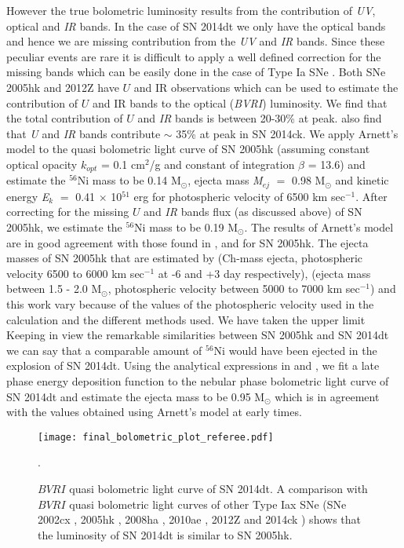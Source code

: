 \documentclass[fleqn,usenatbib]{mnras}
\begin{document}
However the true bolometric luminosity results from the contribution of {\it UV}, optical and {\it IR} bands. In the case of SN 2014dt we only have the optical bands and hence we are missing contribution from the {\it UV} and {\it IR} bands. Since these peculiar events are rare it is difficult to apply a well defined correction for the missing bands which can be easily done in the case of Type Ia SNe  \citep{sent:1996,2000A&A...359..876C}. Both SNe 2005hk and 2012Z have $U$ and IR observations which can be used to estimate the contribution of $U$ and IR bands to the optical ({\it BVRI}) luminosity. We find that the total contribution of $U$ and {\it IR} bands is between 20-30\% at peak. \cite{2016MNRAS.459.1018T} also find that {\it U} and {\it IR} bands contribute  $\sim$ 35\% at peak in SN 2014ck. We apply Arnett's model to the quasi bolometric light curve of SN 2005hk (assuming constant optical opacity $k$$_{opt}$ = 0.1 cm$^2$/g and constant of integration $\beta$ = 13.6) and estimate the $^{56}$Ni mass to be 0.14 M$_{\odot}$, ejecta mass {\it M$_{ej}$} $=$ 0.98 M$_{\odot}$ and kinetic energy {\it E$_{k}$} $=$ 0.41 $\times$ 10$^{51}$ erg for photospheric velocity of 6500 km sec$^{-1}$. After correcting for the missing $U$ and {\it IR} bands flux (as discussed above) of SN 2005hk, we estimate the $^{56}$Ni mass to be 0.19 M$_{\odot}$. The results of Arnett's model are in good agreement with those found in \cite{2008ApJ...680..580S}, \cite{2007PASP..119..360P} and \cite{2015A&A...573A...2S} for SN 2005hk.  The ejecta masses of SN 2005hk that are estimated by \cite{2008ApJ...680..580S} (Ch-mass ejecta, photospheric velocity 6500 to 6000 km sec$^{-1}$ at -6 and +3 day respectively), \cite{2015A&A...573A...2S} (ejecta mass between 1.5 - 2.0 M$_{\odot}$, photospheric velocity between 5000 to 7000 km sec$^{-1}$) and this work vary because of the values of the photospheric velocity used in the calculation and the different methods used. We have taken the upper limit  Keeping in view the remarkable similarities between SN 2005hk and SN 2014dt we can say that a comparable amount of $^{56}$Ni would have been ejected in the explosion of SN 2014dt. Using the analytical expressions in \cite{2003ApJ...593..931M} and \cite{2015ApJ...806..191Y}, we fit a late phase energy deposition function to the nebular phase bolometric light curve of SN 2014dt and estimate the ejecta mass to be 0.95 M$_{\odot}$  which is in agreement with the values obtained using Arnett's model at early times.

\begin{figure}
	\begin{center}
		\texttt{[image: final\_bolometric\_plot\_referee.pdf]}
	\end{center}
	\caption{$BVRI$ quasi bolometric light curve of SN 2014dt. A comparison with $BVRI$ quasi bolometric light curves of other Type Iax SNe (SNe 2002cx \citep{2003PASP..115..453L}, 2005hk \citep{2008ApJ...680..580S}, 2008ha \citep{2009AJ....138..376F}, 2010ae \citep{2014A&A...561A.146S}, 2012Z \citep{2015A&A...573A...2S,2015ApJ...806..191Y} and 2014ck \citep{2016MNRAS.459.1018T}) shows that the luminosity of SN 2014dt is similar to SN 2005hk.}.
	\label{fig:final_bolometric_plot}
\end{figure}
\end{document}
